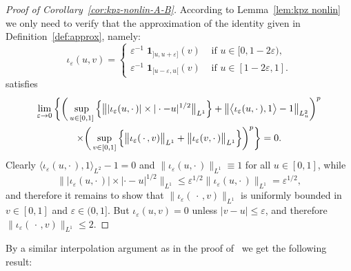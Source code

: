 \documentclass[AHL,Unicode,longabstracts]{cedram}
\renewcommand{\le}{\leqslant}
\begin{document}
\begin{proof}[Proof of Corollary~\ref{cor:kpz-nonlin-A-B}]
According to Lemma~\ref{lem:kpz nonlin} we only need to verify that the approximation of the identity given in Definition~\ref{def:approx}, namely:
\[
\iota_\varepsilon(u, v)=
\begin{cases} \varepsilon^{-1} \; \mathbf{1}_{]u,u+\varepsilon]}(v) & \text{ if } u \in [0, 1 - 2
\varepsilon), \\
\varepsilon^{-1}\; \mathbf{1}_{[u-\varepsilon,u[}(v) & \text{ if } u \in [1 - 2
\varepsilon, 1].
\end{cases}
\]
satisfies
\begin{multline*}
\lim_{\varepsilon \to 0}\bigg\{ \bigg(\sup_{u\in[0,1]} \Big\{\big\| | \iota_\varepsilon (u, \cdot\,) | \times | \cdot - u |^{1/2} \big\|_{L^1}\Big\} + \big\| \big\langle \iota_\varepsilon (u, \cdot\,), 1 \big\rangle - 1 \big\|_{L^2_u}
\bigg)^p \vphantom{\int_0^t}\\
\times \bigg(\sup_{v\in[0,1]} \Big\{ \big\| \iota_\varepsilon (\,\cdot\,, v) \big\|_{L^1} + \big\| \iota_\varepsilon (v, \cdot\,)
\big\|_{L^1} \Big\}\bigg)^p \bigg\} = 0.
\end{multline*}
Clearly $\langle \iota_\varepsilon (u, \cdot\,), 1 \rangle_{L^2} - 1 = 0$ and $\| \iota_\varepsilon (u, \cdot\,)\|_{L^1} \equiv 1$ for all $u \in [0,1]$, while
\[
\big\| | \iota_\varepsilon (u, \cdot\,) | \times | \cdot - u |^{1/2} \big\|_{L^1} \le \varepsilon^{1/2} \big\| \iota_\varepsilon (u, \cdot\,) \big\|_{L^1} = \varepsilon^{1/2},
\]
and therefore it remains to show that $\| \iota_\varepsilon (\,\cdot\,, v) \|_{L^1}$ is uniformly bounded in $v \in [0,1]$ and $\varepsilon \in (0,1]$. But $\iota_\varepsilon(u,v) = 0$ unless $|v - u| \le \varepsilon$, and therefore $\| \iota_\varepsilon (\,\cdot\,, v) \|_{L^1} \le 2$.
\end{proof}

By a similar interpolation argument as in the proof of~\cite[Corollary~3.17]{Gubinelli2015Energy} we get the following result:
\end{document}
